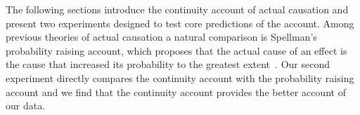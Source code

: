 \documentclass[10pt,letterpaper]{article}
\newcommand{\ev}[2]{$#1_#2$}
\begin{document}
The following sections introduce the continuity account of actual causation and present two experiments designed to test core predictions of the account. Among previous theories of actual causation a natural comparison is Spellman's probability raising account, which proposes that the actual cause of an effect is the cause that increased its probability to the greatest extent~\cite{spellman97}. Our second experiment directly compares the continuity account with the probability raising account and we find that the continuity account provides the better account of our data.


\end{document}
